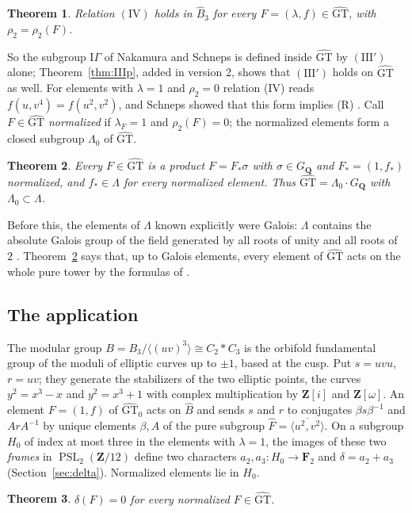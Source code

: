 \documentclass[11pt,a4paper]{article}
\theoremstyle{plain}
\newtheorem{theorem}{Theorem}
\theoremstyle{definition}
\theoremstyle{remark}
\newcommand{\GT}{\widehat{\mathrm{GT}}}
\newcommand{\GTz}{\widehat{\mathrm{GT}}_0}
\newcommand{\Z}{\mathbf Z}
\newcommand{\F}{\mathbf F}
\newcommand{\GQ}{G_{\mathbf Q}}
\newcommand{\Fh}{\widehat F}
\newcommand{\Bh}{\widehat B}
\newcommand{\PSL}{\operatorname{PSL}}
\begin{document}
\begin{theorem}\label{thm:IV}
Relation $(\mathrm{IV})$ holds in $\Bh_3$ for every $F=(\lambda,f)\in\GT$, with $\rho_2=\rho_2(F)$.
\end{theorem}

So the subgroup $\mathrm{I}\Gamma$ of Nakamura and Schneps is defined inside $\GT$ by $(\mathrm{III}')$ alone;
Theorem~\ref{thm:IIIp}, added in version 2, shows that $(\mathrm{III}')$ holds on $\GT$ as well. For
elements with $\lambda=1$ and $\rho_2=0$ relation (IV) reads $f(u,v^4)=f(u^2,v^2)$, and Schneps showed that this
form implies (R) \cite[p.~670]{S}. Call $F\in\GT$ \emph{normalized} if $\lambda_F=1$ and $\rho_2(F)=0$; the
normalized elements form a closed subgroup $\Lambda_0$ of $\GT$.

\begin{theorem}\label{thm:Lambda}
Every $F\in\GT$ is a product $F=F_*\sigma$ with $\sigma\in\GQ$ and $F_*=(1,f_*)$ normalized, and $f_*\in\Lambda$
for every normalized element. Thus $\GT=\Lambda_0\cdot\GQ$ with $\Lambda_0\subset\Lambda$.
\end{theorem}

Before this, the elements of $\Lambda$ known explicitly were Galois: $\Lambda$ contains the absolute Galois group
of the field generated by all roots of unity and all roots of $2$ \cite[p.~3]{HLS}. Theorem~\ref{thm:Lambda} says
that, up to Galois elements, every element of $\GT$ acts on the whole pure tower by the formulas of \cite{HLS}.

\subsection*{The application}
The modular group $B=B_3/\langle(uv)^3\rangle\cong C_2*C_3$ is the orbifold fundamental group of the moduli of
elliptic curves up to $\pm1$, based at the cusp. Put $s=uvu$, $r=uv$; they generate the stabilizers of the two
elliptic points, the curves $y^2=x^3-x$ and $y^2=x^3+1$ with complex multiplication by $\Z[i]$ and $\Z[\omega]$.
An element $F=(1,f)$ of $\GTz$ acts on $\Bh$ and sends $s$ and $r$ to conjugates
$\beta s\beta^{-1}$ and $ArA^{-1}$ by unique elements $\beta,A$ of the pure subgroup
$\Fh=\overline{\langle u^2,v^2\rangle}$. On a subgroup $H_0$ of index at most three in the elements with
$\lambda=1$, the images of these two \emph{frames} in $\PSL_2(\Z/12)$ define two characters $a_2,a_3:H_0\to\F_2$ and
$\delta=a_2+a_3$ (Section~\ref{sec:delta}). Normalized elements lie in $H_0$.

\begin{theorem}\label{thm:delta}
$\delta(F)=0$ for every normalized $F\in\GT$.
\end{theorem}
\end{document}
